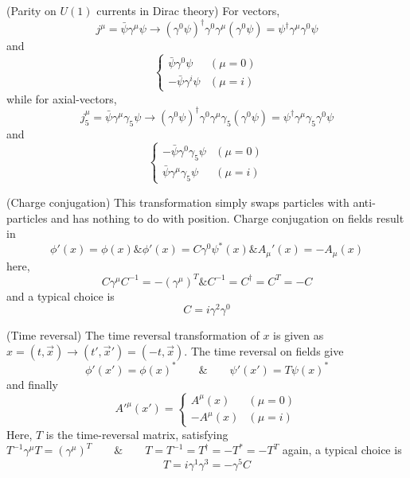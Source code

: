 \vspace{2ex}
\begin{ex}
(Parity on $U(1)$ currents in Dirac theory) For vectors,
\[j^{\mu }=\bar{\psi }\gamma ^{\mu }\psi \rightarrow (\gamma ^{0}\psi )^{\dagger}\gamma ^{0}\gamma ^{\mu }(\gamma ^{0}\psi )=\psi ^{\dagger}\gamma ^{\mu }\gamma ^{0}\psi \]
and
\[\begin{cases}
 \bar{\psi }\gamma ^{0}\psi &(\mu =0)\\
-\bar{\psi }\gamma ^{i}\psi &(\mu =i)
\end{cases}\]
while for axial-vectors,
\[j^{\mu }_{5}=\bar{\psi }\gamma ^{\mu }\gamma _{5}\psi \rightarrow (\gamma ^{0}\psi )^{\dagger}\gamma ^{0}\gamma ^{\mu }\gamma _{5}(\gamma ^{0}\psi )=\psi ^{\dagger}\gamma ^{\mu }\gamma _{5}\gamma ^{0}\psi \]
and
\[\begin{cases}
-\bar{\psi }\gamma ^{0}\gamma _{5}\psi &(\mu =0)\\
\bar{\psi }\gamma ^{\mu }\gamma _{5}\psi &(\mu =i)
\end{cases}\]
\end{ex}
\vspace{2ex}
\begin{defi}
(Charge conjugation) This transformation simply swaps particles with anti-particles and has nothing to do with position. Charge conjugation on fields result in
\[\phi '(x)=\phi (x)\& \phi '(x)=C\gamma ^{0}\psi ^{*}(x)\& A_{\mu }'(x)=-A_{\mu }(x)\]
here,
\[C\gamma ^{\mu }C^{-1}=-(\gamma ^{\mu })^{T}\& C^{-1}=C^{\dagger}=C^{T}=-C\]
and a typical choice is
\[C=i\gamma ^2\gamma ^{0}\]
\end{defi}
\vspace{2ex}
\begin{defi}
(Time reversal) The time reversal transformation of $x$ is given as $x=(t,\vec{x})\rightarrow (t',\vec{x}')=(-t,\vec{x})$. The time reversal on fields give
\[\phi '(x')=\phi (x)^{*}\qquad\&\qquad \psi '(x')=T\psi (x)^{*}\]
and finally
\[A'^{\mu }(x')=\begin{cases}
A^{\mu }(x)&(\mu =0)\\
-A^{\mu }(x)&(\mu =i)
\end{cases}\]
Here, $T$ is the time-reversal matrix, satisfying 
$T^{-1}\gamma ^{\mu }T=(\gamma ^{\mu })^{T}\qquad \&\qquad T=T^{-1}=T^{\dagger}=-T^{*}=-T^{T}$
again, a typical choice is
\[T=i\gamma ^{1}\gamma ^{3}=-\gamma ^{5}C\]
\end{defi}
\vspace{2ex}
 
